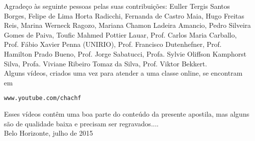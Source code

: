 Agradeço às seguinte pessoas pelas suas contribuições:
Euller Tergis Santos Borges,
Felipe de Lima Horta Radicchi, 
Fernanda de Castro Maia, 
Hugo Freitas Reis,
Marina Werneck Ragozo,
Mariana Chamon Ladeira Amancio,
Pedro Silveira Gomes de Paiva,
Toufic Mahmed Pottier Lauar, 
Prof. Carlos Maria Carballo,
Prof. Fábio Xavier Penna (UNIRIO),
Prof. Francisco Dutenhefner,
Prof. Hamilton Prado Bueno,
Prof. Jorge Sabatucci,
Profa. Sylvie Oliffson Kamphorst Silva,
Profa. Viviane Ribeiro Tomaz da Silva,
Prof. Viktor Bekkert.\\

Alguns vídeos, criados uma vez para atender a uma classe
online, se encontram em 
\begin{center}
\verb|www.youtube.com/chachf|
\end{center}
Esses vídeos contêm uma boa
parte do conteúdo da presente apostila, mas alguns são de
qualidade baixa e precisam ser regravados....
\\

\hfill
Belo Horizonte, julho de 2015

